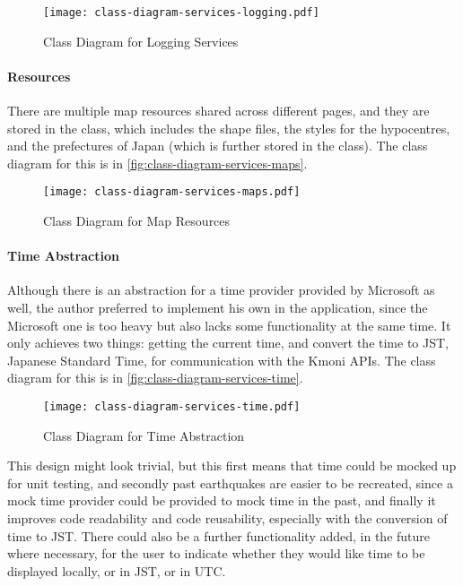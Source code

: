 \begin{figure}[htp]
    \centering
    \texttt{[image: class-diagram-services-logging.pdf]}
    \caption{Class Diagram for Logging Services}
    \label{fig:class-diagram-services-logging}
\end{figure}

\paragraph{Resources}

There are multiple map resources shared across different pages, and they are stored in the  class, which includes the shape files, the styles for the hypocentres, and the prefectures of Japan (which is further stored in the  class).  The class diagram for this is in \autoref{fig:class-diagram-services-maps}.

\begin{figure}[htp]
    \centering
    \texttt{[image: class-diagram-services-maps.pdf]}
    \caption{Class Diagram for Map Resources}
    \label{fig:class-diagram-services-maps}
\end{figure}

\paragraph{Time Abstraction}

Although there is an abstraction for a time provider provided by Microsoft as well, the author preferred to implement his own in the application, since the Microsoft one is too heavy but also lacks some functionality at the same time. It only achieves two things: getting the current time, and convert the time to JST, Japanese Standard Time, for communication with the Kmoni APIs. The class diagram for this is in \autoref{fig:class-diagram-services-time}.

\begin{figure}[htp]
    \centering
    \texttt{[image: class-diagram-services-time.pdf]}
    \caption{Class Diagram for Time Abstraction}
    \label{fig:class-diagram-services-time}
\end{figure}

This design might look trivial, but this first means that time could be mocked up for unit testing, and secondly past earthquakes are easier to be recreated, since a mock time provider could be provided to mock time in the past, and finally it improves code readability and code reusability, especially with the conversion of time to JST. There could also be a further functionality added, in the future where necessary, for the user to indicate whether they would like time to be displayed locally, or in JST, or in UTC.

